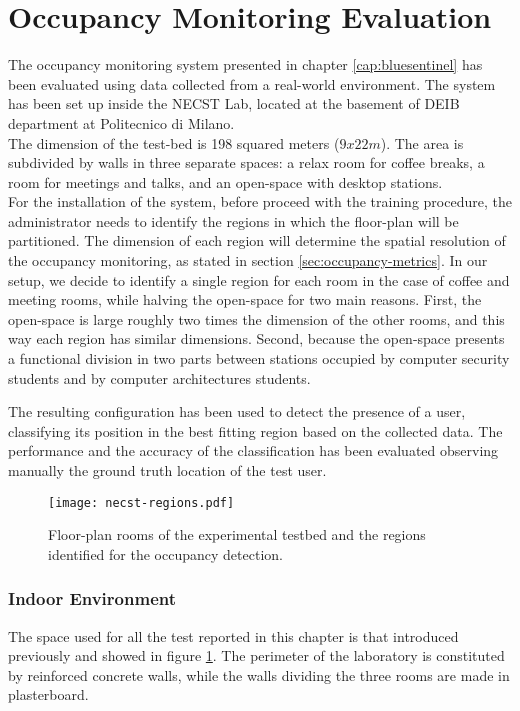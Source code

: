 \section{Occupancy Monitoring Evaluation}
\label{sec:bs-test}
The occupancy monitoring system presented in chapter \ref{cap:bluesentinel} has been evaluated using data collected from a real-world environment. The system has been set up inside the NECST Lab, located at the basement of DEIB department at Politecnico di Milano.\\
The dimension of the test-bed is 198 squared meters ($9x22m$). The area is subdivided by walls in three separate spaces: a relax room for coffee breaks, a room for meetings and talks, and an open-space with desktop stations.\\
For the installation of the system, before proceed with the training procedure, the administrator needs to identify the regions in which the floor-plan will be partitioned. The dimension of each region will determine the spatial resolution of the occupancy monitoring, as stated in section \ref{sec:occupancy-metrics}. In our setup, we decide to identify a single region for each room in the case of coffee and meeting rooms, while halving the open-space for two main reasons. First, the open-space is large roughly two times the dimension of the other rooms, and this way each region has similar dimensions. Second, because the open-space presents a functional division in two parts between stations occupied by computer security students and by computer architectures students.

The resulting configuration has been used to detect the presence of a user, classifying its position in the best fitting region based on the collected data. The performance and the accuracy of the classification has been evaluated observing manually the ground truth location of the test user.

\begin{figure}[h!tb]
\centering\texttt{[image: necst-regions.pdf]}
\caption[Floor-plan rooms of the experimental testbed and the regions identified for the occupancy detection.]{Floor-plan rooms of the experimental testbed and the regions identified for the occupancy detection.}
\label{fig:regions}
\end{figure}

\subsubsection{Indoor Environment}
\label{test-env}
The space used for all the test reported in this chapter is that introduced previously and showed in figure \ref{fig:regions}. The perimeter of the laboratory is constituted by reinforced concrete walls, while the walls dividing the three rooms are made in plasterboard.

